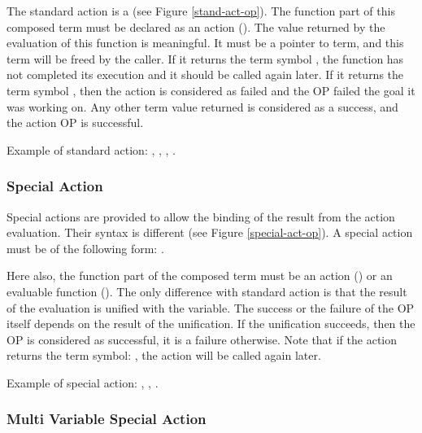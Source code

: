 The standard action is a  (see Figure
\ref{stand-act-op}).  The function part of this composed term must be
declared as an action (). The value
returned by the evaluation of this function is meaningful. It must be a
pointer to term, and this term will be freed by the caller. If it returns
the term symbol , the function has not completed its execution
and it should be called again later.  If it returns the term symbol
, then the action is considered as failed and the OP failed the
goal it was working on. Any other term value returned is considered as a
success, and the action OP is successful.

Example of standard action: , , , .

\subsubsection{Special Action}

Special actions are provided to allow the binding of the result from the
action evaluation. Their syntax is different (see Figure
\ref{special-act-op}). A special action must be of the following form: \*
.


Here also, the function part of the composed term must be an action
() or an evaluable function ().  The only difference with standard action is that the result
of the evaluation is unified with the variable. The success or the failure
of the OP itself depends on the result of the unification. If the
unification succeeds, then the OP is considered as successful, it is a
failure otherwise. Note that if the action returns the term symbol:
, the action will be called again later.

Example of special action: , , .

\subsubsection{Multi Variable Special Action}

